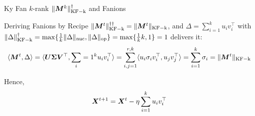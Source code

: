 \documentclass[aspectratio=169]{beamer}
\DeclarePairedDelimiter{\normkfk}{\|}{\|_\mathrm{KF-k}}
\DeclarePairedDelimiter{\norms}{\|}{\|_{\mathrm{op}}}
\DeclarePairedDelimiter{\normn}{\|}{\|_{\mathrm{nuc}}}
\def\<#1,#2>{\langle #1,#2\rangle}
\begin{document}
\begin{frame}{Ky Fan $k$-rank $\normkfk{\mM^k}^\dagger$ and Fanions}

\begin{block}{Deriving Fanions by Recipe} $\normkfk{\mM^t}^{\dagger\dagger} = \normkfk{\mM^t}$, and $\Delta = \sum_{i=1}^k{u_i v_i^\top}$ with $\normkfk{\Delta}^\dagger = \max\{\frac{1}{k} \normn{\Delta}, \norms{\Delta}\} = \max\{\frac{1}{k} k, 1\} = 1$ delivers it:
    $$\<\mM^t, \Delta> =\<\mU \mSigma \mV^\top, \sum_{i=1}^{k} u_i v_i^\top> = \sum_{i,j=1}^{r, k}\<u_i \sigma_i v_i^\top, u_j v_j^\top> = \sum_{i=1}^{k}\sigma_i = \normkfk{\mM^t}$$
    
    Hence,
    $${\bm{X}}^{t+1} = {\bm{X}}^{t} - \eta \sum_{i=1}^{k} u_i v_i^\top$$
    \end{block}
\end{frame}
\end{document}
